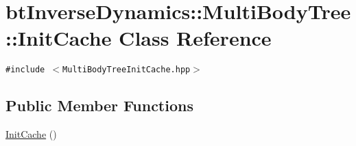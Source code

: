\hypertarget{classbt_inverse_dynamics_1_1_multi_body_tree_1_1_init_cache}{
\section{btInverseDynamics::MultiBodyTree::InitCache Class Reference}
\label{classbt_inverse_dynamics_1_1_multi_body_tree_1_1_init_cache}
}
{\tt \#include $<$MultiBodyTreeInitCache.hpp$>$}

\subsection*{Public Member Functions}
\begin{CompactItemize}
\item 
\hypertarget{classbt_inverse_dynamics_1_1_multi_body_tree_1_1_init_cache_3a0cec52886d731354bf479261409112}{
\hyperlink{classbt_inverse_dynamics_1_1_multi_body_tree_1_1_init_cache_3a0cec52886d731354bf479261409112}{InitCache} ()}
\label{classbt_inverse_dynamics_1_1_multi_body_tree_1_1_init_cache_3a0cec52886d731354bf479261409112}


\end{CompactItemize}
